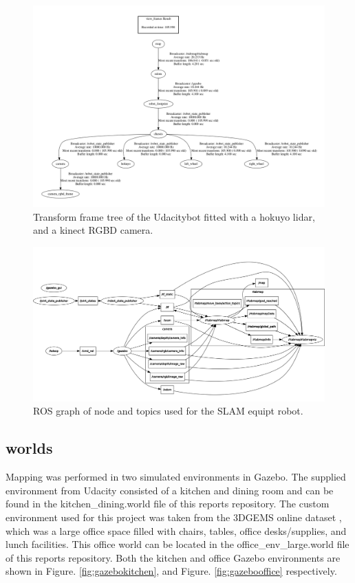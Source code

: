 \documentclass[10pt,journal,compsoc]{IEEEtran}
\begin{document}
\begin{figure}[thpb]
      \centering
      \includegraphics[width=\linewidth]{../img/frame.png}
      \caption{Transform frame tree of the Udacitybot fitted with a hokuyo lidar, and a kinect RGBD camera.}
      \label{fig:tf-tree}
\end{figure}

\begin{figure}[thpb]
      \centering
      \includegraphics[width=\linewidth]{../img/rosgraph.png}
      \caption{ROS graph of node and topics used for the SLAM equipt robot.}
      \label{fig:rqtgraph}
\end{figure}


\subsection{worlds}

Mapping was performed in two simulated environments in Gazebo. The supplied environment from Udacity consisted of a kitchen and dining room and can be found in the kitchen\_dining.world file of this reports repository. The custom environment used for this project was taken from the 3DGEMS online dataset \cite{3DGems}, which was a large office space filled with chairs, tables, office desks/supplies, and lunch facilities. This office world can be located in the office\_env\_large.world file of this reports repository. Both the kitchen and office Gazebo environments are shown in Figure. \ref{fig:gazebokitchen}, and Figure. \ref{fig:gazebooffice} respectively.
\end{document}
